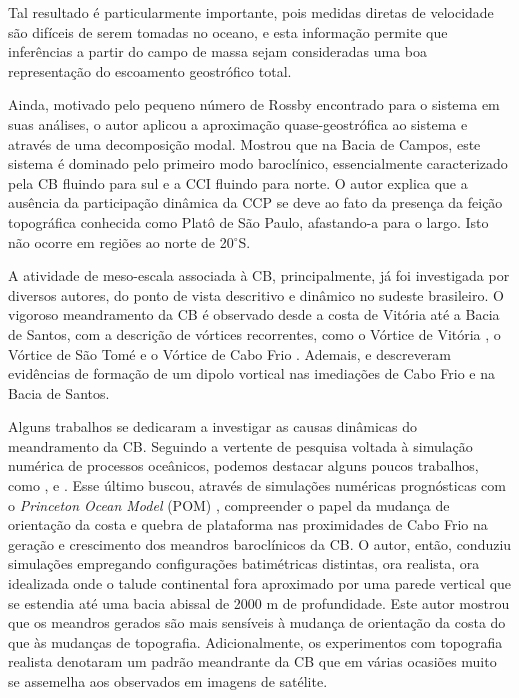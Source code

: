 Tal resultado é particularmente importante, pois medidas diretas de velocidade são
difíceis de serem tomadas no oceano, e esta informação permite que inferências
 a partir do campo de massa sejam consideradas uma boa representação do escoamento
geostrófico total. 

Ainda, motivado pelo pequeno número de Rossby encontrado para
o sistema em suas análises, o autor aplicou a aproximação quase-geostrófica ao 
sistema e através de uma decomposição modal. Mostrou que na Bacia de Campos, este sistema
é dominado pelo primeiro modo baroclínico, essencialmente caracterizado pela
CB fluindo para sul e a CCI fluindo para norte. O autor explica que a ausência da participação dinâmica da
CCP se deve ao fato da presença  da feição topográfica
conhecida como Platô de São Paulo, afastando-a para o largo.
Isto não ocorre em regiões ao norte de 20$^\circ$S.

A atividade de meso-escala associada à  CB, principalmente, já foi investigada por diversos autores, do ponto 
de vista descritivo e dinâmico no sudeste brasileiro. O vigoroso meandramento da CB é observado desde
a costa de Vitória até a Bacia de Santos, com a descrição de vórtices recorrentes, 
como o Vórtice de Vitória \citep{schmid_etal1995}, o Vórtice de São Tomé \citep{calado_etal2006} 
e o Vórtice de Cabo Frio \citep{calado2006}.  Ademais, \cite{campos_etal1995} e 
\cite{pereira2005} descreveram evidências de formação de um dipolo vortical nas imediações de Cabo Frio
e na Bacia de Santos.

Alguns trabalhos se dedicaram a investigar as causas dinâmicas do meandramento
da CB. Seguindo a vertente de pesquisa voltada à simulação numérica de processos oceânicos,
 podemos destacar alguns poucos trabalhos, como \cite{velhote1998}, \cite{goncalves2000}
e \cite{calado2001}. Esse último buscou, através de simulações numéricas prog\-nós\-ti\-cas 
com o {\it Princeton Ocean Model} (POM) \citep{blumberg_mellor1987}, compreender o papel da mudança 
de orientação da costa e quebra de plataforma nas proximidades de Cabo Frio na geração
e crescimento dos meandros baroclínicos da CB. O autor, então, conduziu simulações
empregando configurações batimétricas distintas, ora realista, ora idealizada onde o talude
continental fora aproximado por uma parede vertical que se estendia até uma bacia abissal
de 2000 m de profundidade. Este autor mostrou que os meandros gerados são 
mais sensíveis à mudança de orientação da costa do que às mudanças de topografia.
Adicionalmente, os experimentos com topografia realista denotaram um
padrão meandrante da CB que em várias ocasiões muito se assemelha aos observados
em imagens de satélite.

